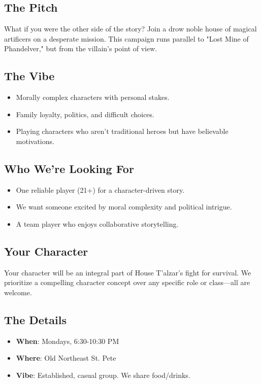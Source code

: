 \documentclass[a4paper, 8pt]{extarticle}
\begin{document}
\color{DrowPurple}


\vspace{2cm}

\subsection*{\textbf{The Pitch}}
What if you were the other side of the story? Join a drow noble house of magical artificers on a desperate mission. This campaign runs parallel to "Lost Mine of Phandelver," but from the villain's point of view.

\subsection*{\textbf{The Vibe}}
\begin{itemize}
    \item Morally complex characters with personal stakes.
    \item Family loyalty, politics, and difficult choices.
    \item Playing characters who aren't traditional heroes but have believable motivations.
\end{itemize}

\subsection*{\textbf{Who We're Looking For}}
\begin{itemize}
    \item One reliable player (21+) for a character-driven story.
    \item We want someone excited by moral complexity and political intrigue.
    \item A team player who enjoys collaborative storytelling.
\end{itemize}

\subsection*{\textbf{Your Character}}
Your character will be an integral part of House T’alzar’s fight for survival. We prioritize a compelling character concept over any specific role or class—all are welcome.

\subsection*{\textbf{The Details}}
\begin{itemize}
    \item \textbf{When}: Mondays, 6:30-10:30 PM
    \item \textbf{Where}: Old Northeast St. Pete
    \item \textbf{Vibe}: Established, casual group. We share food/drinks.
\end{itemize}
\end{document}
